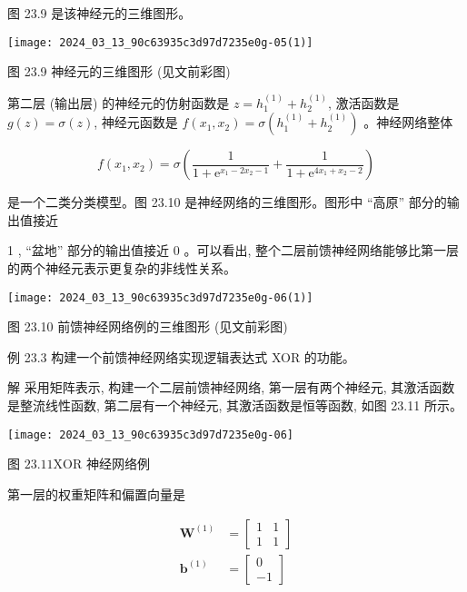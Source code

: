 \documentclass[10pt]{article}
\begin{document}
\begin{CJK*}{UTF8}{bsmi}
图 23.9 是该神经元的三维图形。

\begin{center}
\texttt{[image: 2024\_03\_13\_90c63935c3d97d7235e0g-05(1)]}
\end{center}

图 23.9 神经元的三维图形 (见文前彩图)

第二层 (输出层) 的神经元的仿射函数是 $z=h_{1}^{(1)}+h_{2}^{(1)}$, 激活函数是 $g(z)=\sigma(z)$, 神经元函数是 $f\left(x_{1}, x_{2}\right)=\sigma\left(h_{1}^{(1)}+h_{2}^{(1)}\right)$ 。神经网络整体

$$
f\left(x_{1}, x_{2}\right)=\sigma\left(\frac{1}{1+\mathrm{e}^{x_{1}-2 x_{2}-1}}+\frac{1}{1+\mathrm{e}^{4 x_{1}+x_{2}-2}}\right)
$$

是一个二类分类模型。图 23.10 是神经网络的三维图形。图形中 “高原” 部分的输出值接近

1 , “盆地” 部分的输出值接近 0 。可以看出, 整个二层前馈神经网络能够比第一层的两个神经元表示更复杂的非线性关系。

\begin{center}
\texttt{[image: 2024\_03\_13\_90c63935c3d97d7235e0g-06(1)]}
\end{center}

图 23.10 前馈神经网络例的三维图形 (见文前彩图)

例 23.3 构建一个前馈神经网络实现逻辑表达式 XOR 的功能。

解 采用矩阵表示, 构建一个二层前馈神经网络, 第一层有两个神经元, 其激活函数是整流线性函数, 第二层有一个神经元, 其激活函数是恒等函数, 如图 23.11 所示。

\begin{center}
\texttt{[image: 2024\_03\_13\_90c63935c3d97d7235e0g-06]}
\end{center}

图 $23.11 \mathrm{XOR}$ 神经网络例

第一层的权重矩阵和偏置向量是

$$
\begin{aligned}
\boldsymbol{W}^{(1)} & =\left[\begin{array}{ll}
1 & 1 \\
1 & 1
\end{array}\right] \\
\boldsymbol{b}^{(1)} & =\left[\begin{array}{r}
0 \\
-1
\end{array}\right]
\end{aligned}
$$


\end{CJK*}
\end{document}
